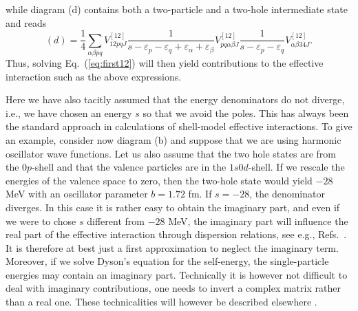 \documentclass{article}
\begin{document}
while diagram (d) contains both a two-particle and a two-hole
intermediate state and reads
\begin{equation}
      (d)=\frac{1}{4}\sum_{\alpha\beta pq}V^{[12]}_{12pq J}
      \frac{1}{s-\varepsilon_p-
                \varepsilon_q+\varepsilon_{\alpha}+
                \varepsilon_{\beta}}
      V^{[12]}_{pq\alpha\beta J}
      \frac{1}{s-\varepsilon_p-
                \varepsilon_q}
       V^{[12]}_{\alpha\beta 34 J}.
      \label{eq:thirdg2h}
\end{equation}
Thus, solving Eq.\ (\ref{eq:first12}) will then
yield contributions to the effective interaction
such as the above expressions.

Here we have also tacitly assumed that the energy denominators
do not diverge, i.e., we have chosen an energy $s$
so that we avoid the poles. This has always been the standard
approach in calculations of shell-model
effective interactions. To give an example, consider
now diagram (b) and suppose that we are using harmonic
oscillator wave functions. Let us also assume that the two
hole states are from the $0p$-shell and that the valence
particles are in the $1s0d$-shell. If we rescale the
energies of the valence space to zero, then the two-hole
state would yield $-28$ MeV with an oscillator parameter
$b=1.72$ fm. If $s=-28$, the denominator diverges.
In this case it is rather easy to obtain the imaginary
part, and even if we were to chose $s$ different
from $-28$ MeV, the imaginary part will influence the real
part of the effective interaction through dispersion
relations, see e.g., Refs.\ \cite{angels88,rpd89,ms92}.
It is therefore at best just a first approximation
to neglect the imaginary term.
Moreover, if we solve Dyson's equation for the
self-energy, the single-particle energies may contain
an imaginary part.
Technically it is however not difficult to deal
with imaginary contributions, one needs to
invert a complex  matrix rather than a real one.
These technicalities
will however be described elsewhere \cite{mhj99}.
\end{document}

